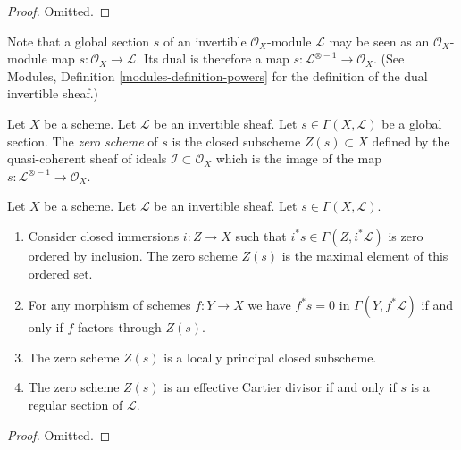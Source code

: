 \begin{proof}
Omitted.
\end{proof}

\noindent
Note that a global section $s$ of an invertible $\mathcal{O}_X$-module
$\mathcal{L}$ may be seen as an $\mathcal{O}_X$-module map
$s : \mathcal{O}_X \to \mathcal{L}$. Its dual is therefore a
map $s : \mathcal{L}^{\otimes -1} \to \mathcal{O}_X$.
(See Modules, Definition \ref{modules-definition-powers}
for the definition of the dual invertible sheaf.)

\begin{definition}
\label{definition-zero-scheme-s}
Let $X$ be a scheme. Let $\mathcal{L}$ be an invertible sheaf.
Let $s \in \Gamma(X, \mathcal{L})$ be a global section.
The {\it zero scheme} of $s$ is the closed subscheme $Z(s) \subset X$
defined by the quasi-coherent sheaf of ideals
$\mathcal{I} \subset \mathcal{O}_X$ which is the image of the
map $s : \mathcal{L}^{\otimes -1} \to \mathcal{O}_X$.
\end{definition}

\begin{lemma}
\label{lemma-zero-scheme}
Let $X$ be a scheme.
Let $\mathcal{L}$ be an invertible sheaf.
Let $s \in \Gamma(X, \mathcal{L})$.
\begin{enumerate}
\item Consider closed immersions $i : Z \to X$ such that
$i^*s \in \Gamma(Z, i^*\mathcal{L})$ is zero
ordered by inclusion. The zero scheme $Z(s)$ is the
maximal element of this ordered set.
\item For any morphism of schemes $f : Y \to X$ we have
$f^*s = 0$ in $\Gamma(Y, f^*\mathcal{L})$ if and only if
$f$ factors through $Z(s)$.
\item The zero scheme $Z(s)$ is a locally principal closed subscheme.
\item The zero scheme $Z(s)$ is an effective Cartier divisor
if and only if $s$ is a regular section of $\mathcal{L}$.
\end{enumerate}
\end{lemma}

\begin{proof}
Omitted.
\end{proof}

